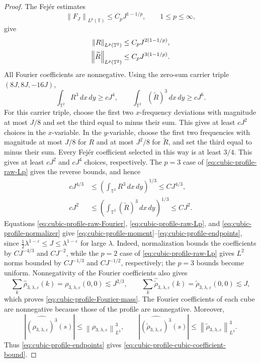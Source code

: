 \documentclass[12pt,reqno,letterpaper]{amsart}
\numberwithin{equation}{section}
\theoremstyle{definition}
\newcommand{\T}{\mathbb T}
\newcommand{\eps}{\varepsilon}
\newcommand{\la}{\lambda}
\newcommand{\norm}[1]{\left\lVert #1\right\rVert}
\newcommand{\abs}[1]{\left\lvert #1\right\rvert}
\begin{document}
\begin{proof}
The Fej\'er estimates
\begin{equation*}
 \norm{F_J}_{L^p(\T)}\leq C_pJ^{1-1/p},
 \qquad1\leq p\leq\infty,
\end{equation*}
give
\begin{align}
 \norm{R}_{L^p(\T^2)}
 &\leq C_pJ^{2(1-1/p)},\notag\\
 \norm{\widetilde R}_{L^p(\T^2)}
 &\leq C_pJ^{3(1-1/p)}.
 \label{eq:cubic-profile-raw-Lp}
\end{align}
All Fourier coefficients are nonnegative.  Using the zero-sum carrier triple
$(8J,8J,-16J)$,
\[
 \int_{\T^2}R^3\,dx\,dy\geq cJ^4,
 \qquad
 \int_{\T^2}(\widetilde R)^3\,dx\,dy\geq cJ^6.
\]
For this carrier triple, choose the first two $x$-frequency deviations with
magnitude at most $J/8$ and set the third equal to minus their sum.  This
gives at least $cJ^2$ choices in the $x$-variable.  In the $y$-variable,
choose the first two frequencies with magnitude at most $J/8$ for $R$ and
at most $J^2/8$ for $\widetilde R$, and set the third equal to minus their
sum.  Every Fej\'er coefficient selected in this way is at least $3/4$.
This gives at least $cJ^2$ and $cJ^4$ choices, respectively.  The
$p=3$ case of
\eqref{eq:cubic-profile-raw-Lp} gives the reverse bounds, and hence
\begin{equation}\label{eq:cubic-profile-normalizer}
 \begin{aligned}
 cJ^{4/3}
 &\leq\left(\int_{\T^2}R^3\,dx\,dy\right)^{1/3}
 \leq CJ^{4/3},\\
 cJ^2
 &\leq\left(\int_{\T^2}(\widetilde R)^3\,dx\,dy\right)^{1/3}
 \leq CJ^2.
 \end{aligned}
\end{equation}
Equations \eqref{eq:cubic-profile-raw-Fourier},
\eqref{eq:cubic-profile-raw-Lp}, and
\eqref{eq:cubic-profile-normalizer} give
\eqref{eq:cubic-profile-moment}--\eqref{eq:cubic-profile-endpoints}, since
$\frac12\la^{1-\eps}\leq J\leq\la^{1-\eps}$ for large $\la$.
Indeed, normalization bounds the coefficients by $CJ^{-4/3}$ and $CJ^{-2}$,
while the $p=2$ case of \eqref{eq:cubic-profile-raw-Lp} gives $L^2$ norms
bounded by $CJ^{-1/3}$ and $CJ^{-1/2}$, respectively; the $p=3$ bounds
become uniform.
Nonnegativity of the Fourier coefficients also gives
\[
 \sum_k\widehat\rho_{3,\la,\eps}(k)
 =\rho_{3,\la,\eps}(0,0)\lesssim J^{2/3},
 \qquad
 \sum_k\widehat{\widetilde{\rho}}_{3,\la,\eps}(k)
 =\widetilde{\rho}_{3,\la,\eps}(0,0)\lesssim J,
\]
which proves \eqref{eq:cubic-profile-Fourier-mass}.  The Fourier
coefficients of each cube are nonnegative because those of the profile are
nonnegative.  Moreover,
\[
 \abs{\widehat{(\rho_{3,\la,\eps})^3}(s)}
 \leq\norm{\rho_{3,\la,\eps}}_{L^3}^3,
 \qquad
 \abs{\widehat{(\widetilde{\rho}_{3,\la,\eps})^3}(s)}
 \leq\norm{\widetilde{\rho}_{3,\la,\eps}}_{L^3}^3.
\]
Thus \eqref{eq:cubic-profile-endpoints} gives
\eqref{eq:cubic-profile-cubic-coefficient-bound}.
\end{proof}
\end{document}
